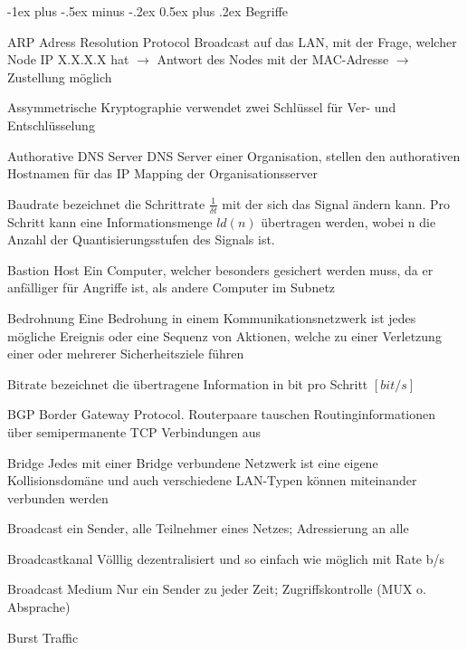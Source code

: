 \documentclass[a4paper]{article}
\makeatletter
\renewcommand{\section}{\@startsection{section}{1}{0mm}%
                                {-1ex plus -.5ex minus -.2ex}%
                                {0.5ex plus .2ex}%
                                {\normalfont\large\bfseries}}
\makeatother
\begin{document}
\begin{multicols}{3}
    \section{Begriffe}
    \begin{description*}
        \item[ARP] Adress Resolution Protocol Broadcast auf das LAN, mit der Frage, welcher Node IP X.X.X.X hat $\rightarrow$ Antwort des Nodes mit der MAC-Adresse $\rightarrow$ Zustellung möglich
        \item[Assymmetrische Kryptographie] verwendet zwei Schlüssel für Ver- und Entschlüsselung
        \item[Authorative DNS Server] DNS Server einer Organisation, stellen den authorativen Hostnamen für das IP Mapping der Organisationsserver
        \item[Baudrate] bezeichnet die Schrittrate $\frac{1}{\delta t}$ mit der sich das Signal ändern kann. Pro Schritt kann eine Informationsmenge $ld(n)$ übertragen werden, wobei n die Anzahl der
        Quantisierungsstufen des Signals ist. %
        \item[Bastion Host] Ein Computer, welcher besonders gesichert werden muss, da er anfälliger für Angriffe ist, als andere Computer im Subnetz
        \item[Bedrohnung] Eine Bedrohung in einem Kommunikationsnetzwerk ist jedes mögliche Ereignis oder eine Sequenz von Aktionen, welche zu einer Verletzung einer oder mehrerer Sicherheitsziele führen
        \item[Bitrate] bezeichnet die übertragene Information in bit pro Schritt $[bit/s]$
        \item[BGP] Border Gateway Protocol. Routerpaare tauschen Routinginformationen über semipermanente TCP Verbindungen aus
        \item[Bridge] Jedes mit einer Bridge verbundene Netzwerk ist eine eigene Kollisionsdomäne und auch verschiedene LAN-Typen können miteinander verbunden werden
        \item[Broadcast] ein Sender, alle Teilnehmer eines Netzes; Adressierung an alle
        \item[Broadcastkanal] Völllig dezentralisiert und so einfach wie möglich mit Rate b/s
        \item[Broadcast Medium] Nur ein Sender zu jeder Zeit; Zugriffskontrolle (MUX o. Absprache)
        \item[Burst Traffic]

\end{description*}
\end{multicols}
\end{document}
